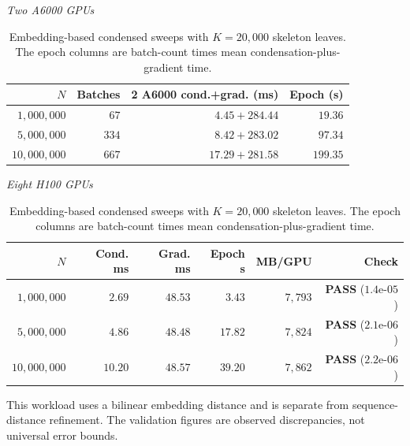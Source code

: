 \begin{table}[!htbp]
\centering\small
\setlength{\tabcolsep}{4pt}
\caption{Embedding-based condensed sweeps with $K=20{,}000$ skeleton leaves. The epoch columns are batch-count times mean condensation-plus-gradient time.}
\label{tab:minibatch_scaling}
\par\smallskip
\textit{Two A6000 GPUs}\par\smallskip
\begin{tabular}{@{}rrrr@{}}
\toprule
$N$ & Batches & 2 A6000 cond.+grad. (ms) & Epoch (s)\\
\midrule
$1{,}000{,}000$ & $67$ & $4.45 + 284.44$ & $19.36$\\
$5{,}000{,}000$ & $334$ & $8.42 + 283.02$ & $97.34$\\
$10{,}000{,}000$ & $667$ & $17.29 + 281.58$ & $199.35$\\
\bottomrule
\end{tabular}
\par\smallskip
\textit{Eight H100 GPUs}\par\smallskip
\begin{tabular}{@{}rrrrrr@{}}
\toprule
$N$ & Cond. ms & Grad. ms & Epoch s & MB/GPU & Check\\
\midrule
$1{,}000{,}000$ & $2.69$ & $48.53$ & $\mathbf{3.43}$ & $7{,}793$ & \textbf{PASS} ($1.4\text{e-}05$)\\
$5{,}000{,}000$ & $4.86$ & $48.48$ & $\mathbf{17.82}$ & $7{,}824$ & \textbf{PASS} ($2.1\text{e-}06$)\\
$10{,}000{,}000$ & $10.20$ & $48.57$ & $\mathbf{39.20}$ & $7{,}862$ & \textbf{PASS} ($2.2\text{e-}06$)\\
\bottomrule
\end{tabular}
\par\medskip\begin{minipage}{\linewidth}\footnotesize This workload uses a bilinear embedding distance and is separate from sequence-distance refinement. The validation figures are observed discrepancies, not universal error bounds.\end{minipage}
\end{table}


